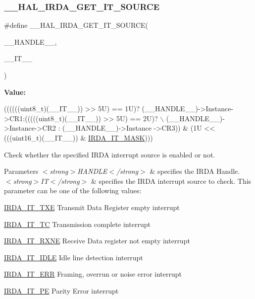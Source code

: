 \subsubsection{\texorpdfstring{\+\_\+\+\_\+\+H\+A\+L\+\_\+\+I\+R\+D\+A\+\_\+\+G\+E\+T\+\_\+\+I\+T\+\_\+\+S\+O\+U\+R\+CE}{\_\_HAL\_IRDA\_GET\_IT\_SOURCE}}
{\footnotesize\ttfamily \#define \+\_\+\+\_\+\+H\+A\+L\+\_\+\+I\+R\+D\+A\+\_\+\+G\+E\+T\+\_\+\+I\+T\+\_\+\+S\+O\+U\+R\+CE(\begin{DoxyParamCaption}\item[{}]{\+\_\+\+\_\+\+H\+A\+N\+D\+L\+E\+\_\+\+\_\+,  }\item[{}]{\+\_\+\+\_\+\+I\+T\+\_\+\+\_\+ }\end{DoxyParamCaption})}

{\bfseries Value\+:}
\begin{DoxyCode}
((((((uint8\_t)(\_\_IT\_\_)) >> 5U) == 1U)? (\_\_HANDLE\_\_)->Instance->CR1:(((((uint8\_t)(\_\_IT\_\_)) >> 5U) == 2U)? \(\backslash\)
                                                       (\_\_HANDLE\_\_)->Instance->CR2 : (\_\_HANDLE\_\_)->Instance
      ->CR3)) & (1U << (((uint16\_t)(\_\_IT\_\_)) & \hyperlink{group___i_r_d_a___interruption___mask_ga38eeb904e4117f70c18bf3767c7ba4a6}{IRDA\_IT\_MASK})))
\end{DoxyCode}


Check whether the specified I\+R\+DA interrupt source is enabled or not. 


\begin{DoxyParams}{Parameters}
{\em $<$strong$>$\+H\+A\+N\+D\+L\+E$<$/strong$>$} & specifies the I\+R\+DA Handle. \\
\hline
{\em $<$strong$>$\+I\+T$<$/strong$>$} & specifies the I\+R\+DA interrupt source to check. This parameter can be one of the following values\+: \begin{DoxyItemize}
\item \hyperlink{group___i_r_d_a___interrupt__definition_ga5e81e9fd3d52bafcf21281c10d2ca257}{I\+R\+D\+A\+\_\+\+I\+T\+\_\+\+T\+XE} Transmit Data Register empty interrupt \item \hyperlink{group___i_r_d_a___interrupt__definition_gadd3e4b796b67db171ca04c5297d4e667}{I\+R\+D\+A\+\_\+\+I\+T\+\_\+\+TC} Transmission complete interrupt \item \hyperlink{group___i_r_d_a___interrupt__definition_ga8f2de9c6c3cccfb2de0277ce10f23b13}{I\+R\+D\+A\+\_\+\+I\+T\+\_\+\+R\+X\+NE} Receive Data register not empty interrupt \item \hyperlink{group___i_r_d_a___interrupt__definition_ga32dfb69029c5576d82feb59129d11000}{I\+R\+D\+A\+\_\+\+I\+T\+\_\+\+I\+D\+LE} Idle line detection interrupt \item \hyperlink{group___i_r_d_a___interrupt__definition_ga5649210cc5343a80483178849a11ac66}{I\+R\+D\+A\+\_\+\+I\+T\+\_\+\+E\+RR} Framing, overrun or noise error interrupt \item \hyperlink{group___i_r_d_a___interrupt__definition_ga1d2b4b601ece8f1ab0b2542412bb2533}{I\+R\+D\+A\+\_\+\+I\+T\+\_\+\+PE} Parity Error interrupt \end{DoxyItemize}
\\
\hline
\end{DoxyParams}

